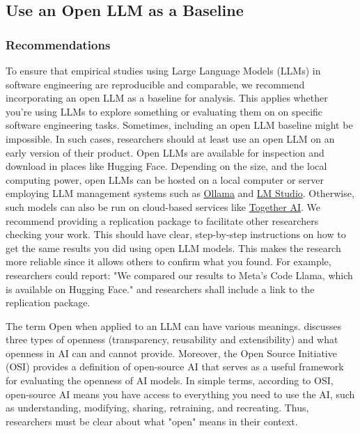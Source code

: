



\subsection{Use an Open LLM as a Baseline}

\subsubsection{Recommendations}

To ensure that empirical studies using Large Language Models (LLMs) in software engineering are reproducible and comparable, 
we recommend incorporating an open LLM as a baseline for analysis. This applies whether you're using LLMs to explore something or evaluating them
on on specific software engineering tasks. 
Sometimes, including an open LLM baseline might be impossible. In such cases, researchers should at least use an open LLM on an early version of their product.
Open LLMs are available for inspection and download in places like Hugging Face. Depending on the size, and the local computing power, open LLMs can be hosted on a local computer or server employing LLM management systems such as \href{https://ollama.com/}{Ollama} and \href{https://lmstudio.ai/}{LM Studio}. Otherwise, such models can also be run on cloud-based services like \href{https://together.ai/}{Together AI}.
We recommend providing a replication package to facilitate other researchers checking your work. This should have clear, step-by-step instructions on how to get the same results you did using open LLM models. This makes the research more reliable since it allows others to confirm what you found.
For example, researchers could report: "We compared our results to Meta's Code Llama, which is available on Hugging Face." and researchers shall include a link to the replication package.

The term Open when applied to an LLM can have various meanings. \cite{widder2024open} discusses three types of openness (transparency, reusability 
and extensibility) and  what openness in AI can and cannot provide. Moreover, the Open Source Initiative (OSI) \cite{OSIAI2024} provides a definition of 
open-source AI that serves as a useful framework for evaluating the openness of AI models. In simple terms, according to OSI, open-source AI means 
you have access to everything you need to use the AI, such as understanding, modifying, sharing, retraining, and recreating. Thus, researchers must 
be clear about what "open" means in their context.

